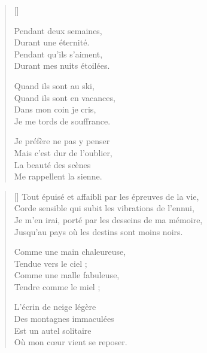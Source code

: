 \settowidth{\versewidth}{Certains prennent ça pour de la liberté,}
\begin{verse}[\versewidth]


Pendant deux semaines, \\
Durant une éternité. \\
Pendant qu'ils s'aiment, \\
Durant mes nuits étoilées.

Quand ils sont au ski, \\
Quand ils sont en vacances, \\
Dans mon coin je cris, \\
Je me tords de souffrance.

Je préfère ne pas y penser \\
Mais c'est dur de l'oublier, \\
La beauté des scènes \\
Me rappellent la sienne.
\end{verse}

\newpage

\settowidth{\versewidth}{Tout épuisé et affaibli par les épreuves de la vie,}
\begin{verse}[\versewidth]
Tout épuisé et affaibli par les épreuves de la vie, \\
Corde sensible qui subit les vibrations de l'ennui, \\
Je m'en irai, porté par les desseins de ma mémoire, \\
Jusqu'au pays où les destins sont moins noirs.

Comme une main chaleureuse, \\
Tendue vers le ciel ; \\
Comme une malle fabuleuse, \\
Tendre comme le miel ;

L'écrin de neige légère \\
Des montagnes immaculées \\
Est un autel solitaire \\
Où mon cœur vient se reposer.
\end{verse}

